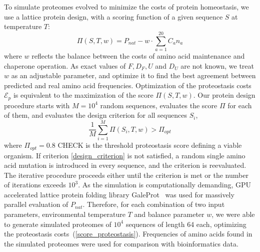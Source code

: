 \documentclass[10pt,letterpaper]{article}
\begin{document}
To simulate proteomes evolved to minimize the costs of protein homeostasis, we use a lattice protein design, with a scoring function of a given sequence $S$ at temperature $T$:
\begin{equation}
	\label{score_proteostasis}
	\Pi(S,T,w) = P_{nat} - w\cdot\sum\limits_{a=1}^{20}C_{a}n_{a}
\end{equation}
where $w$ reflects the balance between the costs of amino acid maintenance and chaperone operation. As exact values of $F,D_{F},U$ and $D_{U}$ are not known, we treat $w$ as an adjustable parameter, and optimize it to find the best agreement between predicted and real amino acid frequencies. Optimization of the proteostasis costs $\mathcal{E}_{p}$ is equivalent to the maximization of the score $\Pi(S,T,w)$. Our protein design procedure  starts with $M=10^{4}$ random sequences, evaluates the score $\Pi$ for each of them, and evaluates the design criterion for all sequences $S_i$,
\begin{equation}
	\label{design_criterion}
	\frac{1}{M}\sum\limits_{i=1}^{M}\Pi(S_{i},T,w) > \Pi_{opt}
\end{equation}
where $\Pi_{opt}=0.8$ CHECK is the threshold proteostasis score defining a viable organism. If criterion \eqref{design_criterion} is not satisfied,  a random single amino acid mutation is introduced in every sequence, and the criterion is reevaluated. The iterative procedure proceeds either until the criterion is met or the number of iterations exceeds $10^{3}$. As the simulation is computationally demanding, GPU accelerated lattice protein folding library GaleProt~\cite{Venev2015Massively} was used for massively parallel evaluation of $P_{nat}$. Therefore, for each combination of two input parameters, environmental temperature $T$ and balance parameter $w$, we were able to generate simulated proteomes of $10^4$ sequences of length 64 each, optimizing the proteostasis costs~(\ref{score_proteostasis}). Frequencies of amino acids found in the simulated proteomes were used for comparison with bioinformatics data.


\end{document}
